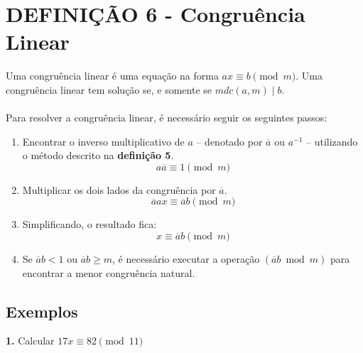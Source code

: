 \section*{DEFINIÇÃO 6 - Congruência Linear}
Uma congruência linear é uma equação na forma $ax \equiv b \pmod m$. Uma congruência linear tem solução se, e somente se $mdc(a,m) \mid b$.\\
\\
Para resolver a congruência linear, é necessário seguir os seguintes passos:

\begin{enumerate}

    \item Encontrar o inverso multiplicativo de $a$ -- denotado por $\overline{a}$ ou $a^{-1}$ -- utilizando o método descrito na \textbf{definição 5}.
          \[
              a \overline{a} \equiv 1 \pmod m
          \]

    \item Multiplicar os dois lados da congruência por $\overline{a}$.
          \[
              \overline{a}ax \equiv \overline{a}b \pmod m
          \]
    \item Simplificando, o resultado fica:
          \[
              x \equiv \overline{a}b \pmod m
          \]
    \item Se $\overline{a}b < 1$ ou $\overline{a}b \geq m$, é necessário executar a operação $(\overline{a}b \bmod m)$ para encontrar a menor congruência natural.

\end{enumerate}

\subsection*{Exemplos}
\textbf{1.} Calcular $17x \equiv 82 \pmod{11}$

